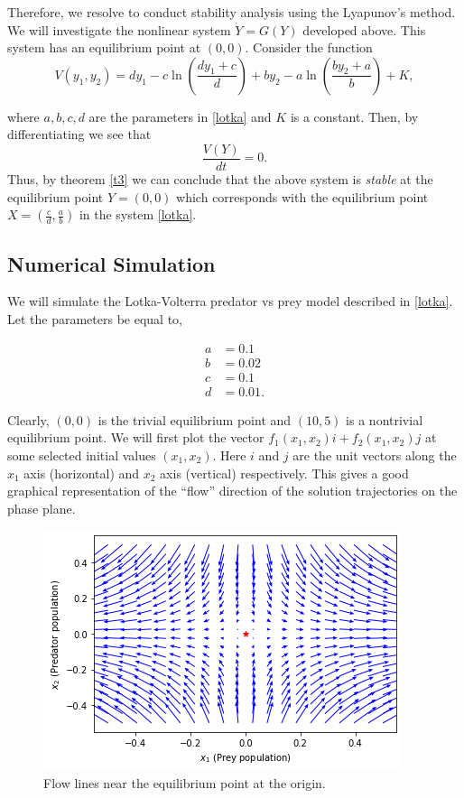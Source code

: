 \documentclass{article}
\begin{document}
Therefore, we resolve to conduct stability analysis using the Lyapunov's method. We will investigate the nonlinear system $\dot{Y}=G(Y)$ developed above. This system has an equilibrium point at $(0,0)$. Consider the function 
\begin{equation}\label{energy}
    V(y_1,y_2) = dy_1 - c \ln\left(\frac{dy_1+c}{d}\right)+by_2- a \ln\left(\frac{by_2+a}{b}\right)+K,
\end{equation}

where $a,b,c,d$ are the parameters in \eqref{lotka} and $K$ is a constant. Then, by differentiating we see that
$$\frac{V(Y)}{dt}=0.$$ Thus, by theorem \eqref{t3} we can conclude that the above system is \emph{stable} at the equilibrium point $Y=(0,0)$ which corresponds with the equilibrium point $X=(\frac{c}{d},\frac{a}{b})$ in the system \eqref{lotka}.

\subsection{Numerical Simulation}
We will simulate the Lotka-Volterra predator vs prey model described in \eqref{lotka}. Let the parameters be equal to,

\begin{align*}
  a &= 0.1\\
  b &= 0.02 \\
  c &= 0.1 \\
  d &= 0.01.
\end{align*}

Clearly, $(0,0)$ is the trivial equilibrium point and $(10,5)$ is a nontrivial equilibrium point. We will first plot the vector $f_1(x_1,x_2)i+f_2(x_1,x_2)j$ at some selected initial values $(x_1,x_2)$. Here $i$ and $j$ are the unit vectors along the $x_1$ axis (horizontal) and $x_2$
axis (vertical) respectively. This gives a good graphical representation of the “flow” direction of the solution trajectories on the phase plane.

\begin{figure}[h]
\centering
\includegraphics[scale=0.75]{images/origin.png}
\caption{Flow lines near the equilibrium point at the origin.}
\label{origin}
\end{figure}
\end{document}
